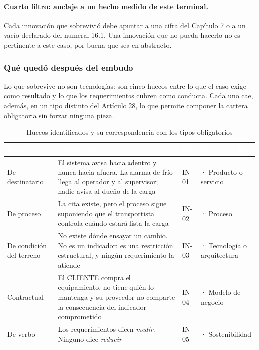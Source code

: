 \paragraph*{Cuarto filtro: anclaje a un hecho medido de este terminal.}
Cada innovación que sobrevivió debe apuntar a una cifra del Capítulo 7 o a un
vacío declarado del numeral 16.1. Una innovación que no pueda hacerlo no es
pertinente a este caso, por buena que sea en abstracto.

\subsubsection{Qué quedó después del embudo}

Lo que sobrevive no son tecnologías: son cinco huecos entre lo que el caso
exige como resultado y lo que los requerimientos cubren como conducta. Cada uno
cae, además, en un tipo distinto del Artículo 28\textdegree{}, lo que permite
componer la cartera obligatoria sin forzar ninguna pieza.

\begin{table}[htbp]
\centering
\caption{Huecos identificados y su correspondencia con los tipos obligatorios}
\label{tab:huecos}
\begin{tabularx}{\textwidth}{@{}>{\raggedright\arraybackslash}p{2.9cm}>{\raggedright\arraybackslash}X>{\raggedright\arraybackslash}p{1.3cm}>{\raggedright\arraybackslash}p{2.9cm}@{}}
\toprule
\rowcolor{terabyteFondo}
\textcolor{white}{\bfseries Hueco} &
\textcolor{white}{\bfseries Enunciado} &
\textcolor{white}{\bfseries ID} &
\textcolor{white}{\bfseries Tipo Art. 28\textdegree{}} \\
\midrule
De destinatario &
El sistema avisa hacia adentro y nunca hacia afuera. La alarma de frío llega al
operador y al supervisor; nadie avisa al dueño de la carga &
IN-01 & 1 · Producto o servicio \\
\addlinespace
De proceso &
La cita existe, pero el proceso sigue suponiendo que el transportista controla
cuándo estará lista la carga &
IN-02 & 2 · Proceso \\
\addlinespace
De condición del terreno &
No existe dónde ensayar un cambio. No es un indicador: es una restricción
estructural, y ningún requerimiento la atiende &
IN-03 & 3 · Tecnología o arquitectura \\
\addlinespace
Contractual &
El CLIENTE compra el equipamiento, no tiene quién lo mantenga y su proveedor no
comparte la consecuencia del indicador comprometido &
IN-04 & 4 · Modelo de negocio \\
\addlinespace
De verbo &
Los requerimientos dicen \emph{medir}. Ninguno dice \emph{reducir} &
IN-05 & 5 · Sostenibilidad \\
\bottomrule
\end{tabularx}
\end{table}

